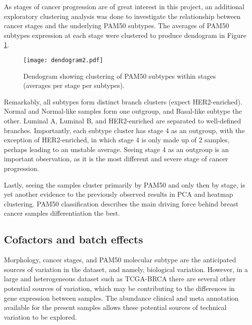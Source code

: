     
    As stages of cancer progression are of great interest in this project, an additional exploratory clustering analysis was done to investigate the relationship between cancer stages and the underlying PAM50 subtypes. The averages of PAM50 subtypes expression at each stage were clustered to produce dendogram in Figure \ref{fig:dendogram}. 
    
            \begin{figure}[!h]
            \centering
            \texttt{[image: dendogram2.pdf]}
            \caption[Dendogram of samples clustered by PAM50 and stage]{Dendogram showing clustering of PAM50 subtypes within stages (averages per stage per subtypes).}
            \label{fig:dendogram}
            \end{figure}
    
    Remarkably, all subtypes form distinct branch clusters (expect HER2-enriched). Normal and Normal-like samples form one outgroup, and Basal-like subtype the other. Luminal A, Luminal B, and HER2-enriched are separated to well-defined branches. Importantly, each subtype cluster has stage 4 as an outgroup, with the exception of HER2-enriched, in which stage 4 is only made up of 2 samples, perhaps leading to an unstable average. Seeing stage 4 as an outgroup is an important observation, as it is the most different and severe stage of cancer progression. 
    
    Lastly, seeing the samples cluster primarily by PAM50 and only then by stage, is yet another evidence to the previously observed results in PCA and heatmap clustering. PAM50 classification describes the main driving force behind breast cancer samples differentiation the best.  
    

    
    \newpage
    \subsection{Cofactors and batch effects}
    
    Morphology, cancer stages, and PAM50 molecular subtype are the anticipated sources of variation in the dataset, and namely, biological variation. However, in a large and heterogeneous dataset such as TCGA-BRCA there are several other potential sources of variation, which may be contributing to the differences in gene expression between samples. The abundance clinical and meta annotation available for the present samples allows these potential sources of technical variation to be explored.
    
